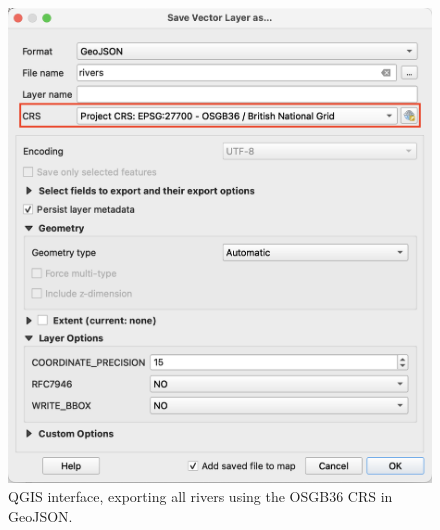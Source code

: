 {
    \begin{figure}[tbh!]
        \centering
        \includegraphics[width=\columnwidth]{figure/qgis/export_rivers.png}
        \caption{QGIS interface, exporting all rivers using the OSGB36 CRS in GeoJSON.}
        \label{fig:export_rivers}
    \end{figure}

}

